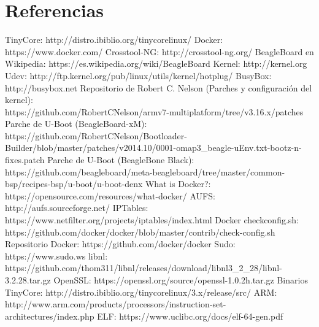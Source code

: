 \documentclass{tfg}
\begin{document}
\chapter{Referencias}
\renewcommand{\section}[2]{}%
\renewcommand{\chapter}[2]{}%
\begin{thebibliography}{9}
	 TinyCore: http://distro.ibiblio.org/tinycorelinux/
	 Docker: https://www.docker.com/
	 Crosstool-NG: http://crosstool-ng.org/
	 BeagleBoard en Wikipedia: https://es.wikipedia.org/wiki/BeagleBoard
	 Kernel: http://kernel.org
	 Udev: http://ftp.kernel.org/pub/linux/utils/kernel/hotplug/
	 BusyBox: http://busybox.net
	 Repositorio de Robert C. Nelson (Parches y configuración del kernel): \\
		https://github.com/RobertCNelson/armv7-multiplatform/tree/v3.16.x/patches
	 Parche de U-Boot (BeagleBoard-xM): \\
		https://github.com/RobertCNelson/Bootloader-Builder/blob/master/patches/v2014.10/0001-omap3\_beagle-uEnv.txt-bootz-n-fixes.patch
	 Parche de U-Boot (BeagleBone Black): \\
		https://github.com/beagleboard/meta-beagleboard/tree/master/common-bsp/recipes-bsp/u-boot/u-boot-denx
	 What is Docker?: https://opensource.com/resources/what-docker/
	 AUFS: http://aufs.sourceforge.net/
	 IPTables: https://www.netfilter.org/projects/iptables/index.html
	 Docker checkconfig.sh: https://github.com/docker/docker/blob/master/contrib/check-config.sh
	 Repositorio Docker: https://github.com/docker/docker
	 Sudo: https://www.sudo.ws
	 libnl: https://github.com/thom311/libnl/releases/download/libnl3\_2\_28/libnl-3.2.28.tar.gz
	 OpenSSL: https://openssl.org/source/openssl-1.0.2h.tar.gz
	 Binarios TinyCore: http://distro.ibiblio.org/tinycorelinux/3.x/release/src/
	 ARM: http://www.arm.com/products/processors/instruction-set-architectures/index.php
	 ELF: https://www.uclibc.org/docs/elf-64-gen.pdf
\end{thebibliography}
\end{document}
